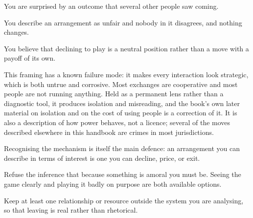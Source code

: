 \begin{feedback}
  \item You are surprised by an outcome that several other people saw coming.
  \item You describe an arrangement as unfair and nobody in it disagrees, and nothing changes.
  \item You believe that declining to play is a neutral position rather than a move with a payoff of its own.
\end{feedback}

\begin{failure}
This framing has a known failure mode: it makes every interaction look strategic, which is both untrue and corrosive. Most exchanges are cooperative and most people are not running anything. Held as a permanent lens rather than a diagnostic tool, it produces isolation and misreading, and the book's own later material on isolation and on the cost of using people is a correction of it. It is also a description of how power behaves, not a licence; several of the moves described elsewhere in this handbook are crimes in most jurisdictions.
\end{failure}

\begin{countermeasures}
  \item Recognising the mechanism is itself the main defence: an arrangement you can describe in terms of interest is one you can decline, price, or exit.
  \item Refuse the inference that because something is amoral you must be. Seeing the game clearly and playing it badly on purpose are both available options.
  \item Keep at least one relationship or resource outside the system you are analysing, so that leaving is real rather than rhetorical.
\end{countermeasures}

\seesources
{}
